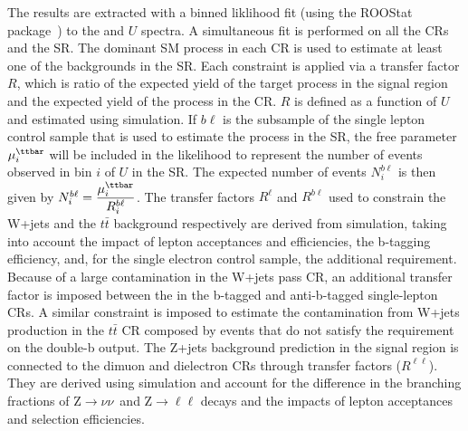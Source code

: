 The results are extracted with a binned liklihood fit (using the ROOStat package~\cite{roostats}) to the \MET and $U$ spectra. A simultaneous fit is performed on all the CRs and the SR. 
The dominant SM process in each CR is used to estimate at least one of the backgrounds in the SR. Each constraint is applied via a transfer factor $R$, which is ratio of the expected yield of the target process in the signal region and the expected yield of the process in the CR. $R$ is defined as a function of $U$ and estimated using simulation. 
If $b\ell$ is the subsample of the single lepton control sample that is used to estimate the \ttbar process in the SR, the free parameter $\mu^{\ttbar}_i$ will be included in the likelihood to represent the number of events observed in bin $i$ of $U$ in the SR. The expected number of events $N^{b\ell}_{i}$ is then given by $N^{b\ell}_{i}=  \dfrac{{\mu^{\ttbar}_{i}}}{R^{b\ell}_{i}}$.
The transfer factors $R^{\ell}$ and $R^{b\ell}$ used to constrain the W+jets and the $t\bar{t}$ background respectively are derived from simulation, taking into account the impact of lepton acceptances and efficiencies, the b-tagging efficiency, and, for the single electron control sample, the additional \MET requirement.
Because of a large \ttbar contamination in the W+jets pass CR, an additional transfer factor is imposed between the \ttbar in the b-tagged and anti-b-tagged single-lepton CRs.
A similar constraint is imposed to estimate the contamination from W+jets production in the $t\bar{t}$ CR composed by events that do not satisfy the requirement on the double-b output. 
The Z+jets background prediction in the signal region is connected to the dimuon and dielectron CRs through transfer factors ($R^{\ell\ell}$).
They are derived using simulation and account for the difference in the branching fractions of $\mathrm{Z}\rightarrow \nu\nu$~and $\mathrm{Z}\rightarrow \ell\ell$ decays and the impacts of lepton acceptances and selection efficiencies.


